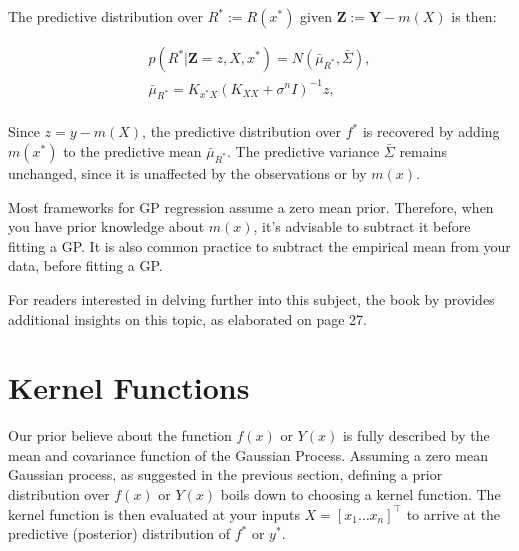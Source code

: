 The predictive distribution over $R^{\ast} := R(x^{\ast})$ given $\mathbf{Z} := \mathbf{Y} - m(X)$ is then:

\begin{gather*}
    p(R^{\ast}| \mathbf{Z} = z, X, x^{\ast}) = N(\bar{\mu}_{R^{\ast}}, \bar{\Sigma}), \\
    \bar{\mu}_{R^{\ast}} = K_{x^{\ast}X} (K_{XX} + \sigma^{n} I )^{-1} z,\\
\end{gather*}

Since $ z = y - m(X)$, the predictive distribution over $f^{\ast}$ is recovered by adding $m(x^{\ast})$ to
the predictive mean $\bar{\mu}_{R^{\ast}}$. The predictive variance $\bar{\Sigma}$ remains unchanged,
since it is unaffected by the observations or by $m(x)$.

%
%
%

Most frameworks for GP regression assume a zero mean prior.
Therefore, when you have prior knowledge about $m(x)$, it's advisable to subtract it before fitting a GP.
It is also common practice to subtract the empirical mean from your data, before fitting a GP.


For readers interested in delving further into this subject,
the book by \citeauthor{rasmussen_gaussian_2006} provides additional insights on this topic,
as elaborated on page 27.


\section{Kernel Functions}\label{sec:kernel}

Our prior believe about the function $f(x)$ or $Y(x)$ is fully
described by the mean and covariance function of the Gaussian Process.
Assuming a zero mean Gaussian process, as suggested in the previous section,
defining a prior distribution over $f(x)$ or $Y(x)$
boils down to choosing a kernel function.
The kernel function is then evaluated at your inputs $X=[x_1 \dots x_n]^{\top}$
to arrive at the predictive (posterior) distribution of $f^{\ast}$ or $y^{\ast}$.

